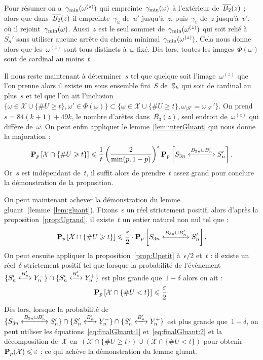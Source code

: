 \begin{dem}
				Pour résumer on a~$\Cmin[\omega^{(z)}]$ qui empreinte~$\Cmin$ à l'extérieur de~$\BRz$ ; alors que dans~$\BRz$ il empreinte~$\gamma_u$ de~$u'$ jusqu'à~$z$, puis~$\gamma_v$ de~$z$ jusqu'à~$v'$, où il rejoint~$\Cmin$. Aussi~$z$ est le seul sommet de~$\Cmin[\omega^{(z)}]$ qui soit relié à~$\overline{S_n'}$ sans utiliser aucune arrête du chemin minimal~$\Cmin[\omega^{(z)}]$. Cela nous donne alors que les~$\omega^{(z)}$ sont tous distincts à~$\omega$ fixé. Dès lors, toutes les images~$\Phi(\omega)$ sont de cardinal au moins~$t$.
				
				Il nous reste maintenant à déterminer~$s$ tel que quelque soit l'image~$\omega^{(z)}$ que l'on prenne alors il existe un sous ensemble fini~$S$ de~$\Sk$ qui soit de cardinal au plus~$s$ et tel que l'on ait l'inclusion~$\{\omega\in\mathcal{X} \cup \{\# U \geq t\} ,\omega'\in\Phi(\omega)\} \subset \{\omega\in\mathcal{X} \cup \{\# U \geq t\} ,\omega_{|S^c}=\omega_{|S^c}'\}$. On prend~$s=84(k+1)+49 k$, le nombre d'arêtes dans~$\overline{B_3}(z)$, seul endroit de~$\omega^{(z)}$ qui diffère de~$\omega$. On peut enfin appliquer le lemme~\ref{lem:interGluant} qui nous donne la majoration :
				\[
					\Pp{\mathcal{X}\cap\{\# U \geq t\}} 
							\leq \frac{1}{t} \left(\frac{2}{\min(p,1-p)}\right)^s
									\Pp{\relie[B_{3n}\cup B_n']{S_{3n}}{S_n'}}.
				\]
				Or~$s$ est indépendant de~$t$, il suffit alors de prendre~$t$ assez grand pour conclure la démonstration de la proposition.
			\end{dem}
			On peut maintenant achever la démonstration du lemme gluant~(lemme~\ref{lem:gluant}). Fixons~$\epsilon$ un réel strictement positif, alors d'après la proposition~\ref{prop:Ugrand}, il existe~$t$ un entier naturel non nul tel que :
			\begin{equation}\label{eq:finalGluant:1}
					\Pp{\mathcal{X}\cap\{\#U \geq t\}} 
				\leq 
					\frac{\epsilon}{2}
					\cdot
					\Pp{\relie[B_{3n}\cup B_n']{S_{3n}}{S_n'}}.			
			\end{equation}
			On peut ensuite appliquer la proposition~\ref{prop:Upetit} à~$\epsilon/2$ et~$t$ : il existe un réel~$\delta$ strictement positif tel que lorsque la probabilité de l'événement~$\{\relie[B_n']{S_n'}{Y_n^-}\}\cap\{\relie[B_n']{S_n'}{Y_n^+}\}$ est plus grande que~$1-\delta$ alors on ait :
			\begin{equation}\label{eq:finalGluant:2}
				\Pp{\mathcal{X}\cap\{\#U < t\}}
				\leq
				\frac{\epsilon}{2}
				\cdot %
			\end{equation}
			Dès lors, lorsque la probabilité de~$\{\relie[B_{3n}\cup B_n']{S_{3n}}{S_n'}\} \cap \{\relie[B_n']{S_n'}{Y_n^-}\} \cap \{\relie[B_n']{S_n'}{Y_n^+}\}$ est plus grande que~$1-\delta$, on peut utiliser les équations~\ref{eq:finalGluant:1} et~\ref{eq:finalGluant:2} et la décomposition de~$\mathcal{X}$ en~$(\mathcal{X}\cap\{\# U \geq t\}) \cup (\mathcal{X}\cap \{\# U < t\})$  pour obtenir~$\PpSP(\mathcal{X}) \leq \epsilon$ ; ce qui achève la démonstration du lemme gluant.

